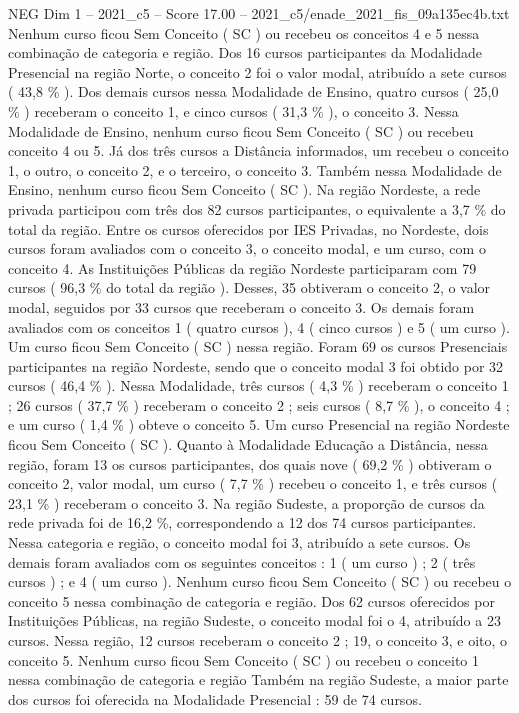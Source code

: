 \begin{textsample}{NEG Dim 1 – 2021\_c5 – Score 17.00 – 2021\_c5/enade\_2021\_fis\_09a135ec4b.txt}
Nenhum curso ficou Sem Conceito ( SC ) ou recebeu os conceitos 4 e 5 nessa combinação de categoria e região.
Dos 16 cursos participantes da Modalidade Presencial na região Norte, o conceito 2 foi o valor modal, atribuído a sete cursos ( 43,8 \% ).
Dos demais cursos nessa Modalidade de Ensino, quatro cursos ( 25,0 \% ) receberam o conceito 1, e cinco cursos ( 31,3 \% ), o conceito 3.
Nessa Modalidade de Ensino, nenhum curso ficou Sem Conceito ( SC ) ou recebeu conceito 4 ou 5.
Já dos três cursos a Distância informados, um recebeu o conceito 1, o outro, o conceito 2, e o terceiro, o conceito 3.
Também nessa Modalidade de Ensino, nenhum curso ficou Sem Conceito ( SC ).
Na região Nordeste, a rede privada participou com três dos 82 cursos participantes, o equivalente a 3,7 \% do total da região.
Entre os cursos oferecidos por IES Privadas, no Nordeste, dois cursos foram avaliados com o conceito 3, o conceito modal, e um curso, com o conceito 4.
As Instituições Públicas da região Nordeste participaram com 79 cursos ( 96,3 \% do total da região ).
Desses, 35 obtiveram o conceito 2, o valor modal, seguidos por 33 cursos que receberam o conceito 3.
Os demais foram avaliados com os conceitos 1 ( quatro cursos ), 4 ( cinco cursos ) e 5 ( um curso ).
Um curso ficou Sem Conceito ( SC ) nessa região.
Foram 69 os cursos Presenciais participantes na região Nordeste, sendo que o conceito modal 3 foi obtido por 32 cursos ( 46,4 \% ).
Nessa Modalidade, três cursos ( 4,3 \% ) receberam o conceito 1 ; 26 cursos ( 37,7 \% ) receberam o conceito 2 ; seis cursos ( 8,7 \% ), o conceito 4 ; e um curso ( 1,4 \% ) obteve o conceito 5.
Um curso Presencial na região Nordeste ficou Sem Conceito ( SC ).
Quanto à Modalidade Educação a Distância, nessa região, foram 13 os cursos participantes, dos quais nove ( 69,2 \% ) obtiveram o conceito 2, valor modal, um curso ( 7,7 \% ) recebeu o conceito 1, e três cursos ( 23,1 \% ) receberam o conceito 3.
Na região Sudeste, a proporção de cursos da rede privada foi de 16,2 \%, correspondendo a 12 dos 74 cursos participantes.
Nessa categoria e região, o conceito modal foi 3, atribuído a sete cursos.
Os demais foram avaliados com os seguintes conceitos : 1 ( um curso ) ; 2 ( três cursos ) ; e 4 ( um curso ).
Nenhum curso ficou Sem Conceito ( SC ) ou recebeu o conceito 5 nessa combinação de categoria e região.
Dos 62 cursos oferecidos por Instituições Públicas, na região Sudeste, o conceito modal foi o 4, atribuído a 23 cursos.
Nessa região, 12 cursos receberam o conceito 2 ; 19, o conceito 3, e oito, o conceito 5.
Nenhum curso ficou Sem Conceito ( SC ) ou recebeu o conceito 1 nessa combinação de categoria e região Também na região Sudeste, a maior parte dos cursos foi oferecida na Modalidade Presencial : 59 de 74 cursos.

\end{textsample}
